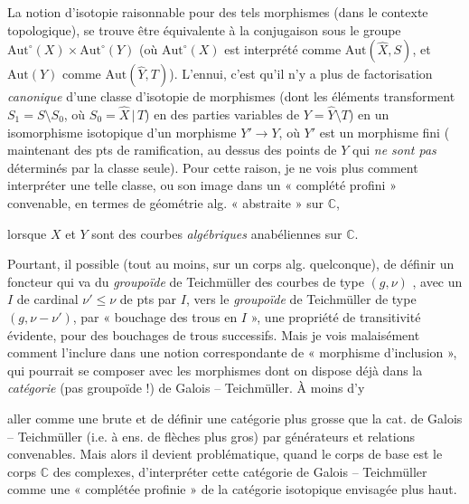 \documentclass[11pt,a4paper]{article}
\begin{document}
La notion d'isotopie raisonnable pour des tels morphismes (dans le contexte topologique), se trouve être équivalente à la conjugaison sous le groupe $\mathrm{Aut}^{\circ}(X)\times\mathrm{Aut}^{\circ}(Y)$ (où $\mathrm{Aut}^{\circ}(X)$ est interprété comme $\mathrm{Aut}(\hat{X},S)$, et $\mathrm{Aut}(Y)$ comme $\mathrm{Aut}(\hat{Y},T)$). L'ennui, c'est qu'il n'y a plus de factorisation \emph{canonique} d'une classe d'isotopie  de morphismes  (dont les éléments  transforment $S_{1}=S\setminus S_{0}$, où $S_{0}=\hat{X}\,|\,T$) en des parties variables de $Y=\hat{Y}\setminus T$) en un isomorphisme  isotopique    d'un morphisme $Y'\to Y$, où $Y'$ est un morphisme fini ( maintenant  \add{\ill{}} des pts de ramification, au dessus des points de $Y$ qui \emph{ne sont pas} déterminés par la classe seule). Pour cette raison, je ne vois plus comment interpréter une telle classe, ou son image dans un  « complété profini » convenable, en termes de géométrie alg. « abstraite » sur $\mathbb{C}$,


lorsque $X$ et $Y$ sont des courbes \emph{algébriques} anabéliennes sur $\mathbb{C}$.

Pourtant, il   possible (tout au moins, sur un corps alg.  quelconque), de définir un foncteur qui va du \emph{groupoïde} de Teichmüller des courbes de type $(g,\nu)$ , avec un  \struck{\ill{}} $I$ de cardinal $\nu'\leq\nu$ de pts  par $I$, vers le \emph{groupoïde} de Teichmüller de type $(g,\nu-\nu')$, par « bouchage des trous en $I$ », \struck{\ill{}}   une propriété de transitivité évidente, pour des bouchages de trous successifs. Mais je vois malaisément comment l'inclure dans une notion correspondante de « morphisme d'inclusion », qui pourrait se composer avec les morphismes dont on dispose déjà dans la \emph{catégorie} (pas groupoïde !) de Galois -- Teichmüller. À moins d'y


aller comme une brute et de définir une catégorie plus grosse que la cat. de Galois -- Teichmüller (i.e. à ens. de flèches plus gros) par générateurs et relations convenables. Mais alors il devient problématique, quand le corps de base est le corps $\mathbb{C}$ des complexes, d'interpréter cette catégorie de Galois -- Teichmüller comme une « complétée profinie » de la catégorie isotopique envisagée plus haut.
\end{document}
